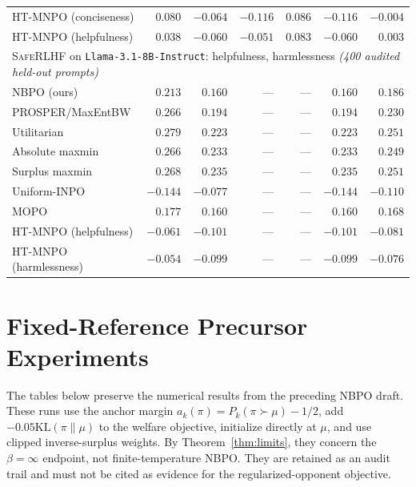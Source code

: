 \documentclass{article}
\theoremstyle{remark}
\theoremstyle{plain}
\newcommand{\KL}{\mathrm{KL}}
\newcommand{\NBPO}{\textsc{NBPO}}
\begin{document}
\begin{table}[t]
\begin{tabular}{lrrrrrr}
HT-MNPO (conciseness) & $0.080$ & $-0.064$ & $-0.116$ & $0.086$ & $-0.116$ & $-0.004$\\
HT-MNPO (helpfulness) & $0.038$ & $-0.060$ & $-0.051$ & $0.083$ & $-0.060$ & $0.003$\\
\midrule
\multicolumn{7}{l}{\textsc{SafeRLHF} on \texttt{Llama-3.1-8B-Instruct}: helpfulness, harmlessness \emph{(400 audited held-out prompts)}}\\
\NBPO{} (ours) & $0.213$ & $0.160$ & --- & --- & $0.160$ & $0.186$\\
PROSPER/MaxEntBW & $0.266$ & $0.194$ & --- & --- & $0.194$ & $0.230$\\
Utilitarian & $\mathbf{0.279}$ & $0.223$ & --- & --- & $0.223$ & $0.251$\\
Absolute maxmin & $0.266$ & $0.233$ & --- & --- & $0.233$ & $0.249$\\
Surplus maxmin & $0.268$ & $\mathbf{0.235}$ & --- & --- & $\mathbf{0.235}$ & $\mathbf{0.251}$\\
Uniform-INPO & $-0.144$ & $-0.077$ & --- & --- & $-0.144$ & $-0.110$\\
MOPO & $0.177$ & $0.160$ & --- & --- & $0.160$ & $0.168$\\
HT-MNPO (helpfulness) & $-0.061$ & $-0.101$ & --- & --- & $-0.101$ & $-0.081$\\
HT-MNPO (harmlessness) & $-0.054$ & $-0.099$ & --- & --- & $-0.099$ & $-0.076$\\
\bottomrule
\end{tabular}
\end{table}


\section{Fixed-Reference Precursor Experiments}
\label{app:legacy}
The tables below preserve the numerical results from the preceding NBPO draft. These runs use the anchor margin $a_k(\pi)=P_k(\pi\succ\mu)-1/2$, add $-0.05\KL(\pi\|\mu)$ to the welfare objective, initialize directly at $\mu$, and use clipped inverse-surplus weights. By Theorem~\ref{thm:limits}, they concern the $\beta=\infty$ endpoint, not finite-temperature \NBPO{}. They are retained as an audit trail and must not be cited as evidence for the regularized-opponent objective.
\end{document}
